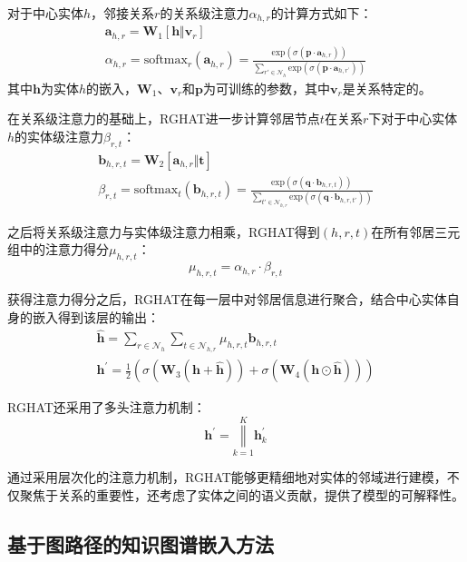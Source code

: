 对于中心实体$h$，邻接关系$r$的关系级注意力$\alpha_{h,r}$的计算方式如下：
\begin{gather}
  \mathbf{a}_{h,r} = \mathbf{W}_1\left[\mathbf{h}\Vert \mathbf{v}_r\right]\\
  \alpha_{h,r}=\mbox{softmax}_r(\mathbf{a}_{h,r})=\frac{\mbox{exp}(\sigma (\mathbf{p}\cdot \mathbf{a}_{h,r}))}{\sum_{r\prime \in \mathcal{N}_h }\mbox{exp}(\sigma(\mathbf{p}\cdot\mathbf{a}_{h,r^\prime}))}
\end{gather}
其中$\mathbf{h}$为实体$h$的嵌入，$\mathbf{W}_1$、$\mathbf{v}_r$和$\mathbf{p}$为可训练的参数，其中$\mathbf{v}_r$是关系特定的。

在关系级注意力的基础上，RGHAT进一步计算邻居节点$t$在关系$r$下对于中心实体$h$的实体级注意力$\beta_{r,t}$：
\begin{gather}
  \mathbf{b}_{h,r,t} = \mathbf{W}_2\left[\mathbf{a}_{h,r}\Vert \mathbf{t}\right]\\
  \beta_{r,t} = \mbox{softmax}_t(\mathbf{b}_{h,r,t}) = \frac{\mbox{exp}(\sigma(\mathbf{q}\cdot\mathbf{b}_{h,r,t}))}{\sum_{t\prime \in \mathcal{N}_{h,r}}\mbox{exp}(\sigma(\mathbf{q}\cdot \mathbf{b}_{h,r,t\prime}))} 
\end{gather}

之后将关系级注意力与实体级注意力相乘，RGHAT得到$(h,r,t)$在所有邻居三元组中的注意力得分$\mu_{h,r,t}$：
\begin{equation}
  \mu_{h,r,t} = \alpha_{h,r} \cdot \beta_{r,t}
\end{equation}

获得注意力得分之后，RGHAT在每一层中对邻居信息进行聚合，结合中心实体自身的嵌入得到该层的输出：
\begin{gather}
  \hat{\mathbf{h}} = \sum_{r\in \mathcal{N}_h } \sum_{t\in\mathcal{N}_{h,r}}\mu_{h,r,t}\mathbf{b}_{h,r,t}\\
  \mathbf{h}^{'}  = \frac{1}{2}\left(\sigma(\mathbf{W}_3(\mathbf{h}+\hat{\mathbf{h}}))+\sigma(\mathbf{W}_4(\mathbf{h}\odot\hat{\mathbf{h}}))\right)
\end{gather}

RGHAT还采用了多头注意力机制：
\begin{equation}
  \mathbf{h}^{'}=\mathop{\Vert}\limits_{k=1}^{K}\mathbf{h}^{'}_k
\end{equation}

通过采用层次化的注意力机制，RGHAT能够更精细地对实体的邻域进行建模，不仅聚焦于关系的重要性，还考虑了实体之间的语义贡献，提供了模型的可解释性。
\subsection{基于图路径的知识图谱嵌入方法}

